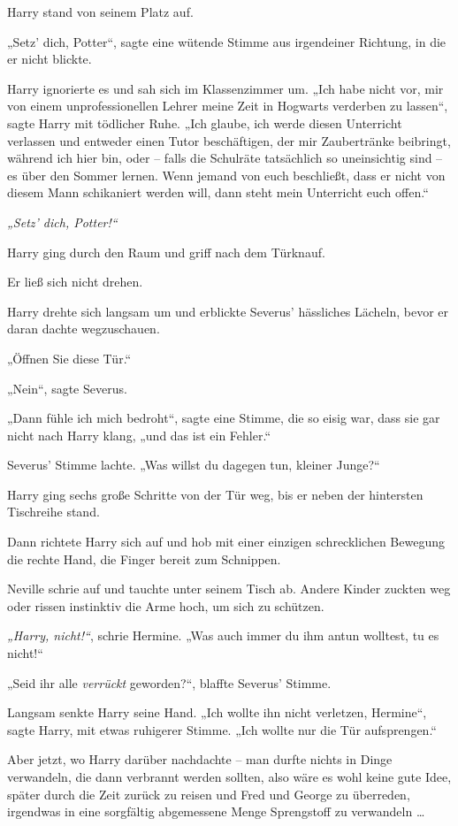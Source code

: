 Harry stand von seinem Platz auf. 

„Setz’ dich, Potter“, sagte eine wütende Stimme aus irgendeiner Richtung, in die er nicht blickte. 

Harry ignorierte es und sah sich im Klassenzimmer um. „Ich habe nicht vor, mir von einem unprofessionellen Lehrer meine Zeit in Hogwarts verderben zu lassen“, sagte Harry mit tödlicher Ruhe. „Ich glaube, ich werde diesen Unterricht verlassen und entweder einen Tutor beschäftigen, der mir Zaubertränke beibringt, während ich hier bin, oder – falls die Schulräte tatsächlich so uneinsichtig sind – es über den Sommer lernen. Wenn jemand von euch beschließt, dass er nicht von diesem Mann schikaniert werden will, dann steht mein Unterricht euch offen.“ 

\emph{„Setz’ dich, Potter!“} 

Harry ging durch den Raum und griff nach dem Türknauf. 

Er ließ sich nicht drehen. 

Harry drehte sich langsam um und erblickte Severus’ hässliches Lächeln, bevor er daran dachte wegzuschauen. 

„Öffnen Sie diese Tür.“ 

„Nein“, sagte Severus. 

„Dann fühle ich mich bedroht“, sagte eine Stimme, die so eisig war, dass sie gar nicht nach Harry klang, „und das ist ein Fehler.“ 

Severus’ Stimme lachte. „Was willst du dagegen tun, kleiner Junge?“ 

Harry ging sechs große Schritte von der Tür weg, bis er neben der hintersten Tischreihe stand. 

Dann richtete Harry sich auf und hob mit einer einzigen schrecklichen Bewegung die rechte Hand, die Finger bereit zum Schnippen. 

Neville schrie auf und tauchte unter seinem Tisch ab. Andere Kinder zuckten weg oder rissen instinktiv die Arme hoch, um sich zu schützen. 

\emph{„Harry, nicht!“}, schrie Hermine. „Was auch immer du ihm antun wolltest, tu es nicht!“ 

„Seid ihr alle \emph{verrückt} geworden?“, blaffte Severus’ Stimme. 

Langsam senkte Harry seine Hand. „Ich wollte ihn nicht verletzen, Hermine“, sagte Harry, mit etwas ruhigerer Stimme. „Ich wollte nur die Tür aufsprengen.“ 

Aber jetzt, wo Harry darüber nachdachte – man durfte nichts in Dinge verwandeln, die dann verbrannt werden sollten, also wäre es wohl keine gute Idee, später durch die Zeit zurück zu reisen und Fred und George zu überreden, irgendwas in eine sorgfältig abgemessene Menge Sprengstoff zu verwandeln … 


